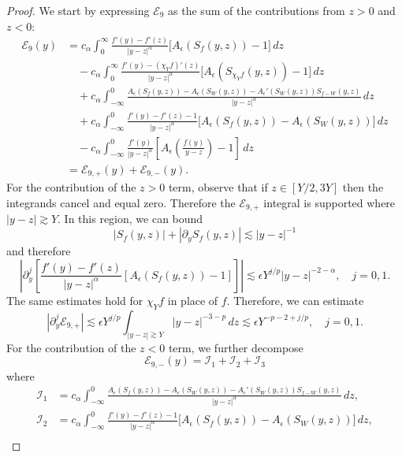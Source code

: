 \documentclass[11pt]{amsart}
\theoremstyle{definition}
\theoremstyle{remark}
\numberwithin{equation}{section}
\newcommand{\mc}[1]{\mathcal{#1}}
\begin{document}
\begin{proof}
    We start by expressing $\mc{E}_9$ as the sum of the contributions from $z > 0$ and $z < 0$:
    \begin{equation}\label{eqn:approx_E9_integral_decomposition}
        \begin{aligned}
            \mc{E}_9(y)
            & = c_\alpha\int_0^\infty\frac{f'(y)-f'(z)}{|y-z|^\alpha}\bigl[A_\epsilon(S_f(y,z))-1\bigr]\,dz\\
            & \quad-c_\alpha\int_0^\infty\frac{f'(y)-(\chi_Yf)'(z)}{|y-z|^\alpha}\bigl[A_\epsilon(S_{\chi_Yf}(y,z))-1\bigr]\,dz\\
            & \quad+c_\alpha\int_{-\infty}^0\frac{A_\epsilon(S_f(y,z))-A_\epsilon(S_W(y,z))-A_\epsilon'(S_W(y,z))S_{f-W}(y,z)}{|y-z|^\alpha}\,dz\\
            & \quad+c_\alpha\int_{-\infty}^0\frac{f'(y)-f'(z)-1}{|y-z|^\alpha}\bigl[A_\epsilon(S_f(y,z))-A_\epsilon(S_W(y,z))\bigr]\,dz\\
            & \quad-c_\alpha\int_{-\infty}^0\frac{f'(y)}{|y-z|^\alpha}\left[A_\epsilon\left(\frac{f(y)}{y-z}\right)-1\right]\,dz \\
            & = \mc{E}_{9,+}(y) + \mc{E}_{9,-}(y).
        \end{aligned}
    \end{equation}
    For the contribution of the $z > 0$ term, observe that if $z \in [Y/2, 3Y]$ then the integrands cancel and equal zero. Therefore the $\mc{E}_{9,+}$ integral is supported where $|y - z| \gtrsim Y$. In this region, we can bound 
    \[|S_f(y, z)| + |\partial_y S_f(y, z)| \lesssim |y - z|^{-1}\]
    and therefore
    \[\left|\partial_y^j \left[\frac{f'(y) - f'(z)}{|y - z|^\alpha}[A_\epsilon(S_f(y,z)) - 1]\right]\right| \lesssim \epsilon Y^{j/p}|y - z|^{-2 - \alpha}, \quad j = 0,1.\]
    The same estimates hold for $\chi_Y f$ in place of $f$. Therefore, we can estimate
    \[|\partial_y^j \mc{E}_{9,+}| \lesssim \epsilon Y^{j/p}\int_{|y - z| \gtrsim Y}|y - z|^{-3 - p} \, dz \lesssim \epsilon Y^{-p - 2 + j/p}, \quad j = 0,1.\]
    For the contribution of the $z < 0$ term, we further decompose 
    \[\mc{E}_{9,-}(y) = \mc{I}_1 + \mc{I}_2 + \mc{I}_3\]
    where 
    \begin{equation}\label{eqn:approx_E9_negative_terms}
        \begin{aligned}
            \mc{I}_1 & = c_\alpha\int_{-\infty}^0\frac{A_\epsilon(S_f(y,z))-A_\epsilon(S_W(y,z))-A_\epsilon'(S_W(y,z))S_{f-W}(y,z)}{|y-z|^\alpha}\,dz,\\
            \mc{I}_2 & = c_\alpha\int_{-\infty}^0\frac{f'(y)-f'(z)-1}{|y-z|^\alpha}\bigl[A_\epsilon(S_f(y,z))-A_\epsilon(S_W(y,z))\bigr]\,dz,\\

\end{aligned}
\end{equation}
\end{proof}
\end{document}

